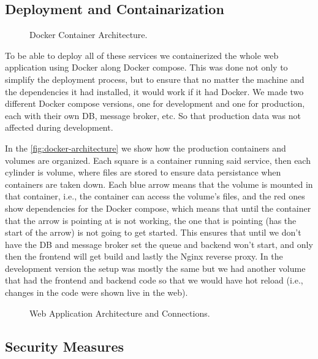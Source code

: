 \subsection{Deployment and Containarization}


\begin{figure}[htbp]
    \centering
    \resizebox{\linewidth}{!}{
      
    }
    \caption{Docker Container Architecture.}
    \label{fig:docker-architecture}
\end{figure}

To be able to deploy all of these services we containerized the whole web application using Docker \autocite{merkelDockerLightweightLinux2014} along Docker compose.
This was done not only to simplify the deployment process,
but to ensure that no matter the machine and the dependencies it had installed,
it would work if it had Docker.
We made two different Docker compose versions, one for development and one for production,
each with their own \ac{DB}, message broker, etc. So that production data was not affected during development.

In the \autoref{fig:docker-architecture} we show how the production containers and volumes are organized.
Each square is a container running said service,
then each cylinder is volume, where files are stored to ensure data persistance when containers are taken down.
Each blue arrow means that the volume is mounted in that container, i.e., the container can access the volume's files,
and the red ones show dependencies for the Docker compose,
which means that until the container that the arrow is pointing at is not working,
the one that is pointing (has the start of the arrow) is not going to get started.
This ensures that until we don't have the \ac{DB} and message broker set
the queue and backend won't start,
and only then the frontend will get build
and lastly the Nginx reverse proxy.
In the development version the setup was mostly the same
but we had another volume that had the frontend and backend code
so that we would have hot reload (i.e., changes in the code were shown live in the web).


\begin{figure}[htbp]
    \centering
     
    \caption{Web Application Architecture and Connections.}
    \label{fig:app-architecture}
\end{figure}


\subsection{Security Measures}

